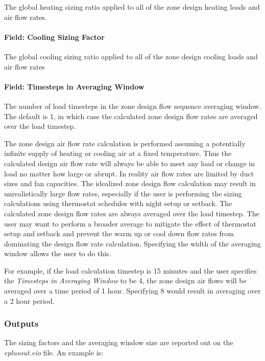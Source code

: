 The global heating sizing ratio applied to all of the zone design heating loads and air flow rates.

\paragraph{Field: Cooling Sizing Factor}\label{field-cooling-sizing-factor}

The global cooling sizing ratio applied to all of the zone design cooling loads and air flow rates

\paragraph{Field: Timesteps in Averaging Window}\label{field-timesteps-in-averaging-window}

The number of load timesteps in the zone design flow sequence averaging window. The default is 1, in which case the calculated zone design flow rates are averaged over the load timestep.

The zone design air flow rate calculation is performed assuming a potentially infinite supply of heating or cooling air at a fixed temperature. Thus the calculated design air flow rate will always be able to meet any load or change in load no matter how large or abrupt. In reality air flow rates are limited by duct sizes and fan capacities. The idealized zone design flow calculation may result in unrealistically large flow rates, especially if the user is performing the sizing calculations using thermostat schedules with night setup or setback. The calculated zone design flow rates are always averaged over the load timestep. The user may want to perform a broader average to mitigate the effect of thermostat setup and setback and prevent the warm up or cool down flow rates from dominating the design flow rate calculation. Specifying the width of the averaging window allows the user to do this.

For example, if the load calculation timestep is 15 minutes and the user specifies the \emph{Timesteps in Averaging Window} to be 4, the zone design air flows will be averaged over a time period of 1 hour. Specifying 8 would result in averaging over a 2 hour period.

\subsubsection{Outputs}\label{outputs-009}

The sizing factors and the averaging window size are reported out on the \emph{eplusout.eio} file. An example is:

